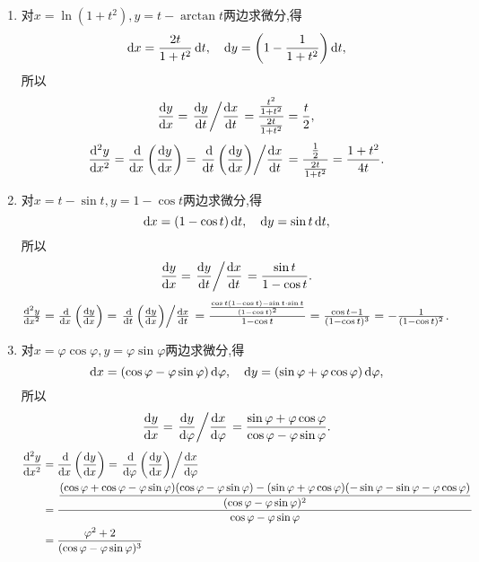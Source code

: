 \begin{solution}
    \begin{enumerate}
        \item 对$x = \ln(1+t^2),y = t-\arctan t$两边求微分,得
        $$\operatorname{d\!} x = \frac{2t}{1+t^2} \operatorname{d\!} t, \quad \operatorname{d\!} y = \left(1-\frac{1}{1+t^2}\right) \operatorname{d\!} t,$$所以
          $$
              \frac{\operatorname{d\!} y}{\operatorname{d\!} x} = \left.\dfrac{\operatorname{d\!} y}{\operatorname{d\!} t}\middle\slash\dfrac{\operatorname{d\!} x}{\operatorname{d\!} t}\right. = \frac{\frac{t^2}{1+t^2}}{\frac{2t}{1+t^2}} = \frac{t}{2},
          $$
          $$\frac{\dif\,\!^2 y}{\dif x^2} = \frac{\dif}{\dif x} \left( \frac{\dif y}{\dif x} \right) =
              \flatfrac{\frac{\dif}{\dif t} \left( \frac{\dif y}{\dif x} \right)}{\frac{\dif x}{\dif t} }= \frac{\frac{1}{2}}{\frac{2t}{1+t^2}} = \frac{1+t^2}{4t}.$$
        \item 对$x = t-\sin t,y = 1-\cos t$两边求微分,得
        $$\operatorname{d\!} x = (1-\cos t) \operatorname{d\!} t, \quad \operatorname{d\!} y = \sin t \operatorname{d\!} t,$$所以
          $$
              \frac{\operatorname{d\!} y}{\operatorname{d\!} x} = \left.\dfrac{\operatorname{d\!} y}{\operatorname{d\!} t}\middle\slash\dfrac{\operatorname{d\!} x}{\operatorname{d\!} t}\right. = \frac{\sin t}{1-\cos t}.
          $$
          $\frac{\dif\,\!^2 y}{\dif x^2} = \frac{\dif}{\dif x} \left( \frac{\dif y}{\dif x} \right) =
              \flatfrac{\frac{\dif}{\dif t} \left( \frac{\dif y}{\dif x} \right)}{\frac{\dif x}{\dif t} }= \frac{\frac{\cos t(1-\cos t) - \sin t \cdot \sin t}{(1-\cos t)^2}}{1-\cos t} = \frac{\cos t - 1}{(1-\cos t)^3} = -\frac{1}{(1-\cos t)^2}$.
        \item 对$x = \varphi\cos\varphi,y = \varphi\sin\varphi$两边求微分,得
        $$\operatorname{d\!} x = (\cos\varphi - \varphi\sin\varphi) \operatorname{d\!} \varphi, \quad \operatorname{d\!} y = (\sin\varphi + \varphi\cos\varphi) \operatorname{d\!} \varphi,$$所以
          $$
              \frac{\operatorname{d\!} y}{\operatorname{d\!} x} = \left.\dfrac{\operatorname{d\!} y}{\operatorname{d\!} \varphi}\middle\slash\dfrac{\operatorname{d\!} x}{\operatorname{d\!} \varphi}\right. = \frac{\sin\varphi + \varphi\cos\varphi}{\cos\varphi - \varphi\sin\varphi}.
          $$
              \begin{align*}
                \frac{\dif\,\!^2 y}{\dif x^2} &=\frac{\dif}{\dif x} \left( \frac{\dif y}{\dif x} \right)=\flatfrac{\frac{\dif}{\dif \varphi} \left( \frac{\dif y}{\dif x} \right)}{\frac{\dif x}{\dif \varphi} }\\
                &=\dfrac{\dfrac{(\cos\varphi + \cos\varphi - \varphi\sin\varphi)(\cos\varphi - \varphi\sin\varphi) - (\sin\varphi + \varphi\cos\varphi)(-\sin\varphi - \sin\varphi - \varphi\cos\varphi)}{(\cos\varphi - \varphi\sin\varphi)^2}}{\cos\varphi - \varphi\sin\varphi}\\
                &=\frac{\varphi^2+2}{(\cos\varphi - \varphi\sin\varphi)^3}

\end{align*}
\end{enumerate}
\end{solution}
